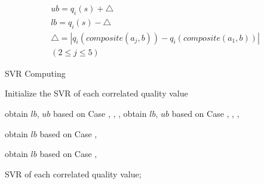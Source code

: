 \begin{equation}
\begin{array}{c}
ub = q_{i}(s) +  \triangle\\
lb = q_{i}(s) -  \triangle\\
\triangle = | q_{i}(composite(a_{j},b)) - q_{i}(composite(a_{1},b)) |\\
(2 \leqslant j \leqslant 5)
\end{array}
\label{E:EQ_delta}
\end{equation}

\begin{algorithm}[htbp]
\caption{SVR Computing}
\label{A:Algo_SVR_Computing}
    Initialize the SVR of each correlated quality value\;
    {
        {
            {
                obtain $lb$, $ub$ based on Case \uppercase\expandafter{},
                                                \uppercase\expandafter{},
                                                \uppercase\expandafter{},
                                                \uppercase\expandafter{}\;
                obtain $lb$, $ub$ based on Case \uppercase\expandafter{},
                                                \uppercase\expandafter{},
                                                \uppercase\expandafter{},
                                                \uppercase\expandafter{}
            }
            \Else
            {
                {
                    obtain $lb$ based on Case \uppercase\expandafter{}
                                                \uppercase\expandafter{},
                                                \uppercase\expandafter{}\;

                }
                \Else
                {
                    obtain $lb$ based on Case \uppercase\expandafter{}
                                                \uppercase\expandafter{},
                                                \uppercase\expandafter{}\;
                }
            }
        }
    }
    {
    \Return SVR of each correlated quality value;
    }
\end{algorithm}

